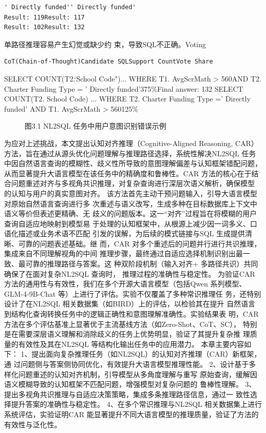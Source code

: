 \documentclass[12pt,a4paper,openright,UTF8]{ctexbook}
\begin{document}
\begin{lstlisting}
' Directly funded'' Directly funded'
Result: 119Result: 117
Result: 102Result: 132
\end{lstlisting}
单路径推理容易产生幻觉或缺少约 束，导致SQL不正确。Voting

\begin{lstlisting}
CoT(Chain-of-Thought)Candidate SQLSupport CountVote Share
\end{lstlisting}
SELECT COUNT(T2.`School Code")... WHERE T1. AvgScrMath > 560AND T2. Charter Funding Type = ' Directly funded'375\%Final answer: 132 SELECT COUNT(T2. School Code) ... WHERE T2. Charter Funding Type =' Directly funded' AND T1. AvgScrMath > 560125\%

\begin{figure}[htbp]
\centering
{}
\caption{图3.1 NL2SQL 任务中用户意图识别错误示例}
\end{figure}

为应对上述挑战，本文提出认知对齐推理（Cognitive-Aligned Reasoning, CAR） 方法，旨在通过从源头优化问题理解与推理路径选择，系统性解决NL2SQL 任务 中因自然语言查询的模糊性、歧义性所导致的意图理解偏差与认知框架错配问题， 从而显著提升大语言模型在该任务中的精确度和鲁棒性。CAR 方法的核心在于结 合问题重述对齐与多视角共识推理，对复杂查询进行深层次语义解析，确保模型 的认知与用户的真实意图对齐。 该方法首先主动干预问题输入，引导大语言模型对原始自然语言查询进行多 次重述与语义改写，生成多种在目标数据库上下文中语义等价但表述更精确、无 歧义的问题版本。这一“对齐”过程旨在将模糊的用户查询自适应地映射到模型易 于处理的认知框架中，从根源上减少因一词多义、口语化描述或业务术语不匹配 引发的误解，为后续的模式链接与SQL 生成提供清晰、可靠的问题表述基础。继 而，CAR 对多个重述后的问题并行进行共识推理，集成来自不同理解视角的中间 推理步骤，最终通过自适应选择机制识别出最一致、最可靠的推理路径与答案。这 种双阶段机制（输入对齐+ 多路径共识）共同确保了在面对复杂NL2SQL 查询时， 推理过程的准确性与稳定性。 为验证CAR 方法的通用性与有效性，我们在多个开源大语言模型（包括Qwen 系列模型、GLM-4-9B-Chat 等）上进行了评估。实验不仅覆盖了多种常识推理任 务，还特别设计了在NL2SQL 相关数据集（如BIRD）上的评估，以检验其在提升 自然语言到结构化查询转换任务中的逻辑正确性和意图理解准确性。实验结果表 明，CAR 方法在多个评估基准上显著优于主流基线方法（如Zero-Shot、CoT、SC）， 特别是在需要深层语义理解和消除歧义的任务上优势明显，验证了其提升复杂推 理质量的有效性及其在NL2SQL 等结构化输出任务中的应用潜力。 本章主要内容如下： 1、提出面向复杂推理任务（如NL2SQL）的认知对齐推理（CAR）新框架，通 过问题侧与答案侧协同优化，有效提升大语言模型推理性能。 2、设计基于多样化问题重述的认知对齐机制，引导模型从多角度理解与重写 原始查询，缓解因语义模糊导致的认知框架不匹配问题，增强模型对复杂问题的 鲁棒性理解。 3、提出多视角共识推理与自适应决策策略，集成多条推理路径信息，通过一 致性选择提升答案的准确性与稳定性。 4、在多个常识推理与NL2SQL 相关数据集上进行系统评估，实验证明CAR 能显著提升不同大语言模型的推理质量，验证了方法的有效性与泛化性。
\end{document}
